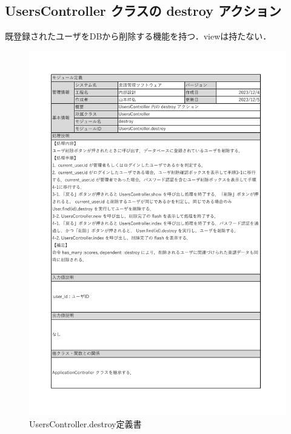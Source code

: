 \subsection*{UsersController クラスの destroy アクション}
既登録されたユーザをDBから削除する機能を持つ．viewは持たない．
\begin{figure}[H]
    \centering
    \includegraphics[scale=0.6]{img/Users/xlsx/UsersController_destroy.pdf}
    \vspace{-1cm}
    \caption{UsersController.destroy定義書}
\end{figure}
